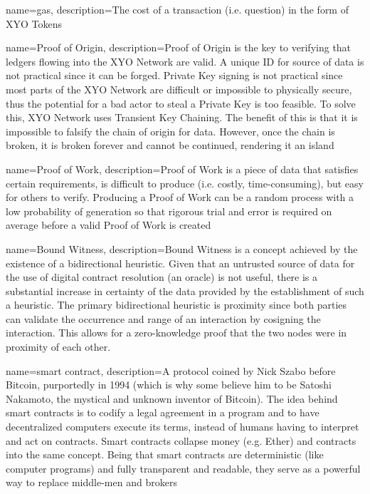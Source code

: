 \documentclass{article}
\begin{document}
{
    name={gas},
    description={The cost of a transaction (i.e. question) in the form of XYO Tokens}
}

{
    name={Proof of Origin},
    description={Proof of Origin is the key to verifying that ledgers flowing into the XYO Network are valid. A unique ID for source of data is not practical since it can be forged. Private Key signing is not practical since most parts of the XYO Network are difficult or impossible to physically secure, thus the potential for a bad actor to steal a Private Key is too feasible. To solve this, XYO Network uses Transient Key Chaining. The benefit of this is that it is impossible to falsify the chain of origin for data. However, once the chain is broken, it is broken forever and cannot be continued, rendering it an island}
}

{
    name={Proof of Work},
    description={Proof of Work is a piece of data that satisfies certain requirements, is difficult to produce (i.e. costly, time-consuming), but easy for others to verify. Producing a Proof of Work can be a random process with a low probability of generation so that rigorous trial and error is required on average before a valid Proof of Work is created}
}

{
    name={Bound Witness},
    description={Bound Witness is a concept achieved by the existence of a bidirectional heuristic. Given that an untrusted source of data for the use of digital contract resolution (an oracle) is not useful, there is a substantial increase in certainty of the data provided by the establishment of such a heuristic. The primary bidirectional heuristic is proximity since both parties can validate the occurrence and range of an interaction by cosigning the interaction. This allows for a zero-knowledge proof that the two nodes were in proximity of each other.}
}

{
    name={smart contract},
    description={A protocol coined by Nick Szabo before Bitcoin, purportedly in 1994 (which is why some believe him to be Satoshi Nakamoto, the mystical and unknown inventor of Bitcoin). The idea behind smart contracts is to codify a legal agreement in a program and to have decentralized computers execute its terms, instead of humans having to interpret and act on contracts. Smart contracts collapse money (e.g. Ether) and contracts into the same concept. Being that smart contracts are deterministic (like computer programs) and fully transparent and readable, they serve as a powerful way to replace middle-men and brokers}
}
\end{document}
